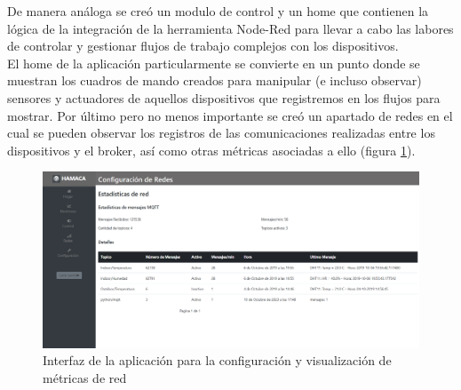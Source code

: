 De manera análoga se creó un modulo de control y un home que contienen la lógica de la integración de la herramienta Node-Red para llevar a cabo las labores de controlar y gestionar flujos de trabajo complejos con los dispositivos.\\


El home de la aplicación particularmente se convierte en un punto donde se muestran los cuadros de mando creados para manipular (e incluso observar) sensores y actuadores de aquellos dispositivos que registremos en los flujos para mostrar. Por último pero no menos importante se creó un apartado de redes en el cual se pueden observar los registros de las comunicaciones realizadas entre los dispositivos y el broker, así como otras métricas asociadas a ello (figura  \ref{fig:hamaca_redes}).\\


\begin{figure}[!htb]
\centering
\includegraphics[scale=0.2]{./Figuras/hamaca_redes.png}
\caption{Interfaz de la aplicación para la configuración y visualización de métricas de red}
\label{fig:hamaca_redes}
\vspace*{-10pt}
\end{figure}

